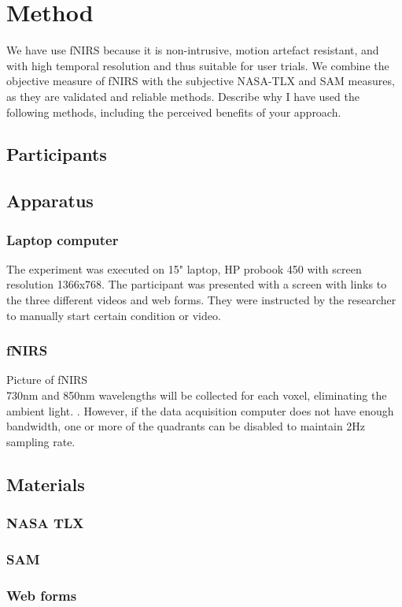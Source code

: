 \documentclass[a4paper]{report}
\begin{document}
	\section{Method}
	We have use fNIRS because it is non-intrusive, motion artefact resistant, and with high temporal resolution and thus suitable for user trials. We combine the objective measure of fNIRS with the subjective NASA-TLX and SAM measures, as they are validated and reliable methods.
	Describe why I have used the following methods, including the perceived benefits of your approach\cite{preferences-study}.
		\subsection{Participants}
		\subsection{Apparatus}
			\subsubsection{Laptop computer}
			The experiment was executed on 15" laptop, HP probook 450 with screen resolution 1366x768. The participant was presented with a screen with links to the three different videos and web forms. They were instructed by the researcher to manually start certain condition or video. 
			\subsubsection{fNIRS}
			Picture of fNIRS\\
			730nm and 850nm wavelengths will be collected for each voxel, eliminating the ambient light. . However, if the data acquisition computer does not have enough bandwidth,
			one or more of the quadrants can be disabled to maintain 2Hz sampling rate. 
        \subsection{Materials}
			\subsubsection{NASA TLX}
			\subsubsection{SAM}
			\subsubsection{Web forms}
\end{document}
